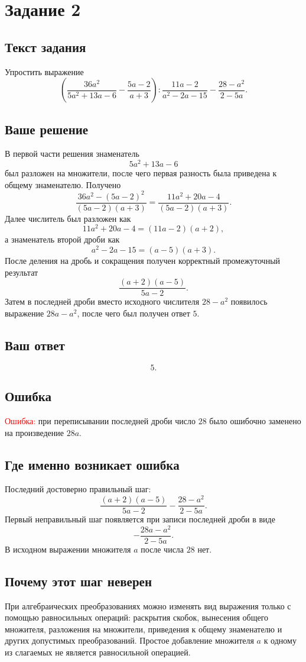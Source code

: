 \documentclass[12pt,a4paper]{article}
\begin{document}
\newpage
{}\label{task:2}
\section*{Задание 2}

\subsection*{Текст задания}
Упростить выражение
\[
\left(
\frac{36a^2}{5a^2+13a-6}
-
\frac{5a-2}{a+3}
\right)
:
\frac{11a-2}{a^2-2a-15}
-
\frac{28-a^2}{2-5a}.
\]

\subsection*{Ваше решение}
В первой части решения знаменатель
\[
5a^2+13a-6
\]
был разложен на множители, после чего первая разность была приведена к общему знаменателю. Получено
\[
\frac{36a^2-(5a-2)^2}{(5a-2)(a+3)}
=
\frac{11a^2+20a-4}{(5a-2)(a+3)}.
\]
Далее числитель был разложен как
\[
11a^2+20a-4=(11a-2)(a+2),
\]
а знаменатель второй дроби как
\[
a^2-2a-15=(a-5)(a+3).
\]
После деления на дробь и сокращения получен корректный промежуточный результат
\[
\frac{(a+2)(a-5)}{5a-2}.
\]
Затем в последней дроби вместо исходного числителя $28-a^2$ появилось выражение $28a-a^2$, после чего был получен ответ $5$.

\subsection*{Ваш ответ}
\[
5.
\]

\subsection*{Ошибка}
\textcolor{red}{Ошибка:} при переписывании последней дроби число $28$ было ошибочно заменено на произведение $28a$.

\subsection*{Где именно возникает ошибка}
Последний достоверно правильный шаг:
\[
\frac{(a+2)(a-5)}{5a-2}
-
\frac{28-a^2}{2-5a}.
\]
Первый неправильный шаг появляется при записи последней дроби в виде
\[
-\frac{28a-a^2}{2-5a}.
\]
В исходном выражении множителя $a$ после числа $28$ нет.

\subsection*{Почему этот шаг неверен}
При алгебраических преобразованиях можно изменять вид выражения только с помощью равносильных операций: раскрытия скобок, вынесения общего множителя, разложения на множители, приведения к общему знаменателю и других допустимых преобразований. Простое добавление множителя $a$ к одному из слагаемых не является равносильной операцией.
\end{document}
